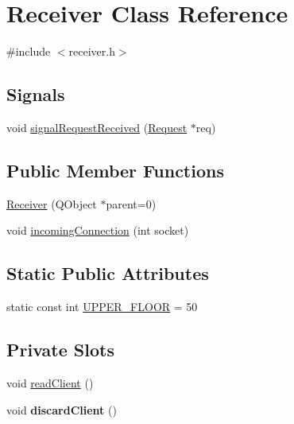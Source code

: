 \hypertarget{class_receiver}{
\section{Receiver Class Reference}
\label{class_receiver}
}


{\ttfamily \#include $<$receiver.h$>$}

\subsection*{Signals}
\begin{DoxyCompactItemize}
\item 
void \hyperlink{class_receiver_a1d7579bc5666c14449f5986d6fd26e7d}{signalRequestReceived} (\hyperlink{class_request}{Request} $\ast$req)
\end{DoxyCompactItemize}
\subsection*{Public Member Functions}
\begin{DoxyCompactItemize}
\item 
\hyperlink{class_receiver_af9c313fb6638894c3e31f6ed93684728}{Receiver} (QObject $\ast$parent=0)
\item 
void \hyperlink{class_receiver_a4e4b7449e28362cdfeb05c349f6d1888}{incomingConnection} (int socket)
\end{DoxyCompactItemize}
\subsection*{Static Public Attributes}
\begin{DoxyCompactItemize}
\item 
static const int \hyperlink{class_receiver_a9960b604c1574e1d5876aeef979addfd}{UPPER\_\-FLOOR} = 50
\end{DoxyCompactItemize}
\subsection*{Private Slots}
\begin{DoxyCompactItemize}
\item 
void \hyperlink{class_receiver_a48b94424274f0d0fc2a3bbee87aaa25c}{readClient} ()
\item 
\hypertarget{class_receiver_a0a7a8e1194211358e027e3ada7cfdb36}{
void {\bfseries discardClient} ()}
\label{class_receiver_a0a7a8e1194211358e027e3ada7cfdb36}

\end{DoxyCompactItemize}


